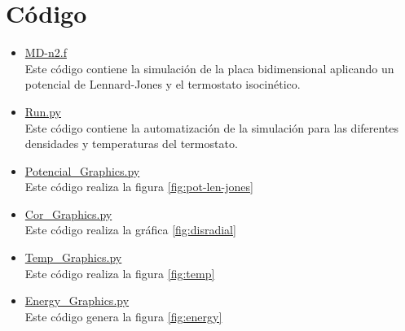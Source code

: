 \documentclass[reprint,amsmath,amssymb,aps,]{revtex4-2}
\begin{document}
\section{Código}
\begin{itemize}
\item \href{https://github.com/giovannilopez9808/Notas_Agosto_2020/blob/master/Simulaciones/Proyecto_2/Scripts/MD-n2.f}{MD-n2.f}\\
Este código contiene la simulación de la placa bidimensional aplicando un potencial de Lennard-Jones y el termostato isocinético.
\item \href{https://github.com/giovannilopez9808/Notas_Agosto_2020/blob/master/Simulaciones/Proyecto_2/Scripts/Run.py}{Run.py}\\
Este código contiene la automatización de la simulación para las diferentes densidades y temperaturas del termostato.
\item \href{https://github.com/giovannilopez9808/Notas_Agosto_2020/blob/master/Simulaciones/Proyecto_2/Scripts/Potencial_Graphics.py}{Potencial\_Graphics.py}\\
Este código realiza la figura \ref{fig:pot-len-jones}
\item \href{https://github.com/giovannilopez9808/Notas_Agosto_2020/blob/master/Simulaciones/Proyecto_2/Scripts/Cor_Graphics.py}{Cor\_Graphics.py}\\
Este código realiza la gráfica \ref{fig:disradial}
\item \href{https://github.com/giovannilopez9808/Notas_Agosto_2020/blob/master/Simulaciones/Proyecto_2/Scripts/Temp_Graphics.py}{Temp\_Graphics.py}\\
Este código realiza la figura \ref{fig:temp}
\item \href{https://github.com/giovannilopez9808/Notas_Agosto_2020/blob/master/Simulaciones/Proyecto_2/Scripts/Energy_Graphics.py}{Energy\_Graphics.py}\\
Este código genera la figura \ref{fig:energy}
\end{itemize}

\nocite{*}

\end{document}
